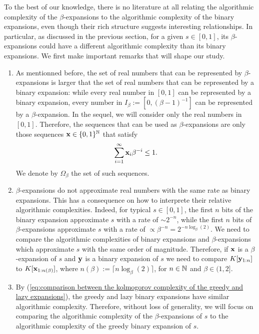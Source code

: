 To the best of our knowledge, there is no literature at all relating the algorithmic complexity of the $\beta$-expansions to the algorithmic complexity of the binary expansions, even though their rich structure suggests interesting relationships. In particular, as discussed in the previous section, for a given $s\in [0,1]$, its $\beta$-expansions could have a different algorithmic complexity than its binary expansions. We first make important remarks that will shape our study.
	\begin{enumerate}[label=(\alph*)]
		\item As mentionned before, the set of real numbers that can be represented by $\beta$-expansions is larger that the set of real numbers that can be represented by a binary expansion: while every real number in $[0,1]$ can be represented by a binary expansion, every number in $I_\beta := [0, (\beta-1)^{-1}]$ can be represented by a $\beta$-expansion. In the sequel, we will consider only the real numbers in $[0,1]$. Therefore, the sequences that can be used as $\beta$-expansions are only those sequences ${\bf x} \in \{0,1\}^{\mathbb{N}}$ that satisfy
		\begin{equation}
			\sum_{i=1}^\infty {\bf x}_i \beta^{-i} \leq 1.
		\end{equation}
		We denote by $\Omega_\beta$ the set of such sequences.
		\item $\beta$-expansions do not approximate real numbers with the same rate as binary expansions. This has a consequence on how to interprete their relative algorithmic complexities. Indeed, for typical $s \in [0,1]$, the first $n$ bits of the binary expansion approximate $s$ with a rate of $\sim 2^{-n}$, while the first $n$ bits of $\beta$-expansions approximate $s$ with a rate of $\propto \beta^{-n} = 2^{-n\log_\beta(2)}$. We need to compare the algorithmic complexities of binary expansions and $\beta$-expansions which approximate $s$ with the same order of magnitude. Therefore, if ${\bf x}$ is a $\beta$-expansion of $s$ and ${\bf y}$ is a binary expansion of $s$ we need to compare $K[{\bf y}_{1:n}]$ to $K[{\bf x}_{1:n(\beta)}]$, where $n(\beta) := \lceil n \log_\beta(2) \rceil$, for $n \in \mathbb{N}$ and $\beta \in (1,2]$.
		\item By (\ref{eq:comparison between the kolmogorov complexity of the greedy and lazy expansions}), the greedy and lazy binary expansions have similar algorithmic complexity. Therefore, without loss of generality, we will focus on comparing the algorithmic complexity of the $\beta$-expansions of $s$ to the algorithmic complexity of the greedy binary expansion of $s$.

\end{enumerate}

